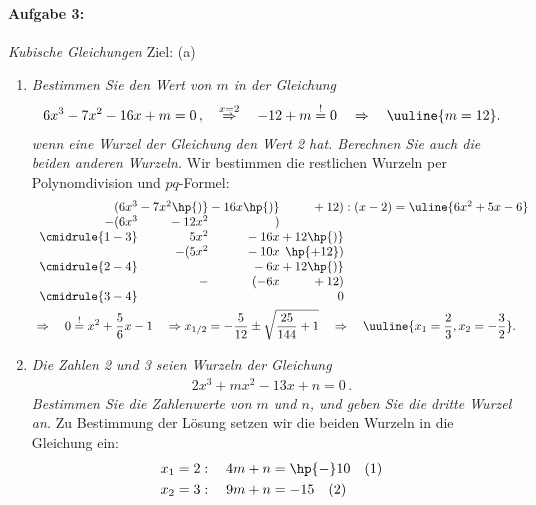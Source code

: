 \paragraph{Aufgabe 3: } \emph{Kubische Gleichungen} \hfill Ziel: (a)\\[-4mm]
\begin{enumerate}[label=(\alph*)]
    \item \emph{Bestimmen Sie den Wert von $m$ in der Gleichung}
    \begin{align*}
    6x^3-7x^2-16x+m=0\,, \quad \overset{x=2}{\Rightarrow} \quad -12 + m \overset{!}{=} 0 \quad \Rightarrow \quad \uuline{m=12}.
    \end{align*}
    \emph{wenn eine Wurzel der Gleichung den Wert 2 hat. Berechnen Sie auch die beiden anderen Wurzeln.} Wir bestimmen die restlichen Wurzeln per Polynomdivision und $pq$-Formel: 
    \begin{align*}
        &\begin{array}{r@{} r@{} r@{} r@{} r}
            (6x^3 &{}-7x^2\hp{)}&{}-16x\hp{)}&{}+12) &\;:(x-2) = \uline{6x^2+5x-6} \\
          -(6x^3 &{}-12x^2&{}) \\ 
          \cmidrule{1-3}
                & 5x^2 &{} -16x &{}+12\hp{)}\\
                &-(5x^2&{} -10x&{}\hp{+12}) \\
          \cmidrule{2-4}
                & &{}-6x&{}+12\hp{)}\\
                & -&(-6x&{}+12)\\
          \cmidrule{3-4} 
                & & & 0
        \end{array}\\
        & \Rightarrow \quad 0 \overset{!}{=} x^2 +\frac{5}{6}x -1 \quad \Rightarrow x_{1/2} = -\frac{5}{12} \pm \sqrt{\frac{25}{144}+1} \quad \Rightarrow \quad \uuline{x_1 = \frac{2}{3}, x_2 = -\frac{3}{2}}.
    \end{align*}
    \item \emph{Die Zahlen 2 und 3 seien Wurzeln der Gleichung}
    \begin{align*}
    2x^3+mx^2-13x+n=0\,.
    \end{align*}
    \emph{Bestimmen Sie die Zahlenwerte von $m$ und $n$, und geben Sie die dritte Wurzel an.}
    Zu Bestimmung der Lösung setzen wir die beiden Wurzeln in die Gleichung ein: 
    \begin{align*}
        &x_1 = 2: \quad 4m + n = \hp{-}10 \quad (1)\\
        &x_2 = 3: \quad 9m + n = -15 \quad (2)\\

\end{align*}
\end{enumerate}
